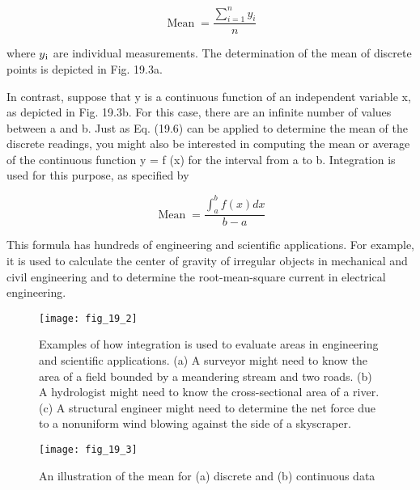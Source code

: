\documentclass[../main.tex]{subfiles}
\begin{document}
\begin{equation}
    \tag{19.6}
	\operatorname{Mean}=\frac{\sum_{i=1}^{n} y_{i}}{n}
	\end{equation}

	where $y\textsubscript{i}$ are individual measurements. The determination of the mean of discrete points is
	depicted in Fig. 19.3a.

	In contrast, suppose that y is a continuous function of an independent variable x, as
	depicted in Fig. 19.3b. For this case, there are an infinite number of values between a and
	b. Just as Eq. (19.6) can be applied to determine the mean of the discrete readings,
	you might also be interested in computing the mean or average of the continuous function
	y = f (x) for the interval from a to b. Integration is used for this purpose, as specified by 

	\begin{equation}
		\tag{19.7}
		\operatorname{Mean}=\frac{\int_{a}^{b} f(x) d x}{b-a}
		\end{equation}

		This formula has hundreds of engineering and scientific applications. For example, it is
		used to calculate the center of gravity of irregular objects in mechanical and civil engineering and to determine the root-mean-square current in electrical engineering.

		\begin{figure}[H]
			\centering
			\texttt{[image: fig\_19\_2]}
		   \caption{\textsf{Examples of how integration is used to evaluate areas in engineering and scientific applications. (a) A surveyor might
		   need to know the area of a field bounded by a meandering stream and two roads. (b) A hydrologist might need to
		   know the cross-sectional area of a river. (c) A structural engineer might need to determine the net force due to a
		   nonuniform wind blowing against the side of a skyscraper.}}\label{fig:fig_19_2}
		\end{figure}

		\begin{figure}[H]
			\centering
			\texttt{[image: fig\_19\_3]}
		   \caption{\textsf{An illustration of the mean for (a) discrete and (b) continuous data}}\label{fig:fig_19_3}
		\end{figure}
\end{document}
